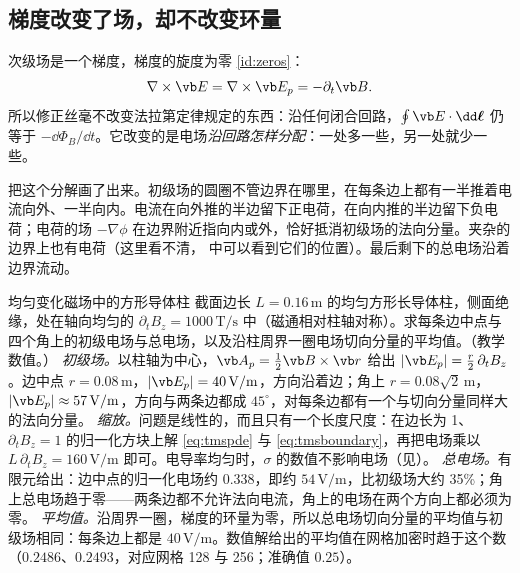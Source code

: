 \subsection{梯度改变了场，却不改变环量}
次级场是一个梯度，梯度的旋度为零 \eqref{id:zeros}：
\begin{equation}
\nabla\times\vb E=\nabla\times\vb E_p=-\partial_t\vb B .
\end{equation}
所以修正丝毫不改变法拉第定律规定的东西：沿任何闭合回路，$\oint\vb E\cdot\dd\boldsymbol\ell$ 仍等于 $-\dd\Phi_B/\dd t$。它改变的是电场\emph{沿回路怎样分配}：一处多一些，另一处就少一些。


 把这个分解画了出来。初级场的圆圈不管边界在哪里，在每条边上都有一半推着电流向外、一半向内。电流在向外推的半边留下正电荷，在向内推的半边留下负电荷；电荷的场 $-\nabla\phi$ 在边界附近指向内或外，恰好抵消初级场的法向分量。夹杂的边界上也有电荷（这里看不清， 中可以看到它们的位置）。最后剩下的总电场沿着边界流动。

\begin{example}{均匀变化磁场中的方形导体柱}\label{ex:tms-square}
截面边长 $L=0.16\,\mathrm m$ 的均匀方形长导体柱，侧面绝缘，处在轴向均匀的 $\partial_tB_z=1000\,\mathrm{T/s}$ 中（磁通相对柱轴对称）。求每条边中点与四个角上的初级电场与总电场，以及沿柱周界一圈电场切向分量的平均值。（教学数值。）
\solution
\emph{初级场。}以柱轴为中心，$\vb A_p=\tfrac12\vb B\times\vb r$ 给出 $|\vb E_p|=\tfrac r2\,\partial_tB_z$。边中点 $r=0.08\,\mathrm m$，$|\vb E_p|=40\,\mathrm{V/m}$，方向沿着边；角上 $r=0.08\sqrt2\,\mathrm m$，$|\vb E_p|\approx57\,\mathrm{V/m}$，方向与两条边都成 $45^\circ$，对每条边都有一个与切向分量同样大的法向分量。
\emph{缩放。}问题是线性的，而且只有一个长度尺度：在边长为 1、$\partial_tB_z=1$ 的归一化方块上解 \eqref{eq:tmspde} 与 \eqref{eq:tmsboundary}，再把电场乘以 $L\,\partial_tB_z=160\,\mathrm{V/m}$ 即可。电导率均匀时，$\sigma$ 的数值不影响电场（见）。
\emph{总电场。}有限元给出：边中点的归一化电场约 $0.338$，即约 $54\,\mathrm{V/m}$，比初级场大约 35\%；角上总电场趋于零——两条边都不允许法向电流，角上的电场在两个方向上都必须为零。
\emph{平均值。}沿周界一圈，梯度的环量为零，所以总电场切向分量的平均值与初级场相同：每条边上都是 $40\,\mathrm{V/m}$。数值解给出的平均值在网格加密时趋于这个数（$0.2486$、$0.2493$，对应网格 128 与 256；准确值 $0.25$）。
\end{example}


